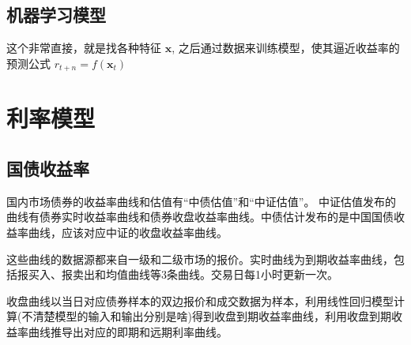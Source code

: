 \documentclass[11pt,oneside,a4paper,notitlepage]{article}
\newcommand{\vect}[1]{\mathbf{#1}}
\begin{document}
\begin{CJK}{UTF8}{gbsn}
\subsection{机器学习模型}
这个非常直接，就是找各种特征 $\vect x$, 之后通过数据来训练模型，使其逼近收益率的预测公式 $r_{t+n} = f(\vect x_t)$


\section{利率模型}
\subsection{国债收益率}
国内市场债券的收益率曲线和估值有“中债估值”和“中证估值”。
中证估值发布的曲线有债券实时收益率曲线和债券收盘收益率曲线。中债估计发布的是中国国债收益率曲线，应该对应中证的收盘收益率曲线。

这些曲线的数据源都来自一级和二级市场的报价。实时曲线为到期收益率曲线，包括报买入、报卖出和均值曲线等3条曲线。交易日每1小时更新一次。

收盘曲线以当日对应债券样本的双边报价和成交数据为样本，利用线性回归模型计算(不清楚模型的输入和输出分别是啥)得到收盘到期收益率曲线，利用收盘到期收益率曲线推导出对应的即期和远期利率曲线。


\end{CJK}
\end{document}
